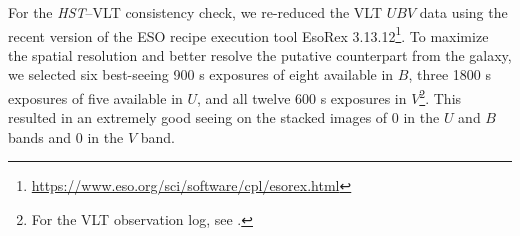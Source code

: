 \documentclass[pdftex,twocolumn]{aastex62}
\begin{document}
For the {\sl HST}--VLT consistency check, we re-reduced  the VLT $UBV$  data %
using  the recent version of the  
ESO recipe execution tool EsoRex 3.13.12\footnote{\url{https://www.eso.org/sci/software/cpl/esorex.html}}. To maximize the spatial resolution and better resolve the putative counterpart from the  galaxy, we selected six best-seeing 900 s  exposures of eight available in $B$, three 1800 s exposures of five available in $U$, and all twelve  %
600 s exposures %
in $V$\footnote{For the VLT observation log, see \citet{Mignani2003}.}. This  resulted in an extremely good seeing on the stacked images of 0 in the $U$ and $B$ bands and 0 in the $V$ band. 
\end{document}
